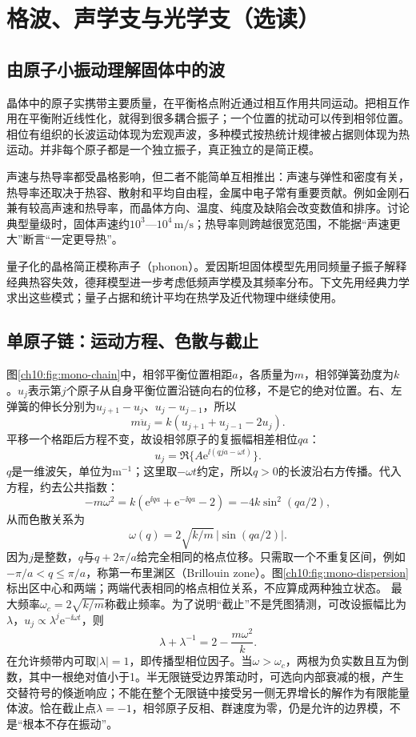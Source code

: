 \section{格波、声学支与光学支（选读）}\label{ch10:sec:lattice}
\subsection{由原子小振动理解固体中的波}
晶体中的原子实携带主要质量，在平衡格点附近通过相互作用共同运动。把相互作用在平衡附近线性化，就得到很多耦合振子；一个位置的扰动可以传到相邻位置。相位有组织的长波运动体现为宏观声波，多种模式按热统计规律被占据则体现为热运动。并非每个原子都是一个独立振子，真正独立的是简正模。

声速与热导率都受晶格影响，但二者不能简单互相推出：声速与弹性和密度有关，热导率还取决于热容、散射和平均自由程，金属中电子常有重要贡献。例如金刚石兼有较高声速和热导率，而晶体方向、温度、纯度及缺陷会改变数值和排序。讨论典型量级时，固体声速约$10^3$—$10^4\,\mathrm{m/s}$；热导率则跨越很宽范围，不能据“声速更大”断言“一定更导热”。

量子化的晶格简正模称声子（phonon）。爱因斯坦固体模型先用同频量子振子解释经典热容失效，德拜模型进一步考虑低频声学模及其频率分布。下文先用经典力学求出这些模式；量子占据和统计平均在热学及近代物理中继续使用。

\subsection{单原子链：运动方程、色散与截止}
图\ref{ch10:fig:mono-chain}中，相邻平衡位置相距$a$，各质量为$m$，相邻弹簧劲度为$k$。$u_j$表示第$j$个原子从自身平衡位置沿链向右的位移，不是它的绝对位置。右、左弹簧的伸长分别为$u_{j+1}-u_j$、$u_j-u_{j-1}$，所以
\begin{equation}\label{ch10:eq:mono-motion}
 m\ddot u_j=k(u_{j+1}+u_{j-1}-2u_j).
\end{equation}
\chTenMonoChainFigure
平移一个格距后方程不变，故设相邻原子的复振幅相差相位$qa$：
\[
 u_j=\Re\{A\mathrm e^{\ii(qja-\omega t)}\}.
\]
$q$是一维波矢，单位为$\mathrm{m^{-1}}$；这里取$-\omega t$约定，所以$q>0$的长波沿右方传播。代入方程，约去公共指数：
\[
 -m\omega^2=k(\mathrm e^{\ii qa}+\mathrm e^{-\ii qa}-2)
 =-4k\sin^2(qa/2),
\]
从而色散关系为
\begin{equation}\label{ch10:eq:mono-dispersion}
 \omega(q)=2\sqrt{k/m}\,|\sin(qa/2)|.
\end{equation}
因为$j$是整数，$q$与$q+2\pi/a$给完全相同的格点位移。只需取一个不重复区间，例如$-\pi/a<q\leq\pi/a$，称第一布里渊区（Brillouin zone）。图\ref{ch10:fig:mono-dispersion}标出区中心和两端；两端代表相同的格点相位关系，不应算成两种独立状态。
\chTenMonoDispersionFigure
最大频率$\omega_c=2\sqrt{k/m}$称截止频率。为了说明“截止”不是凭图猜测，可改设振幅比为$\lambda$，$u_j\propto\lambda^j\mathrm e^{-\ii\omega t}$，则
\[
 \lambda+\lambda^{-1}=2-\frac{m\omega^2}{k}.
\]
在允许频带内可取$|\lambda|=1$，即传播型相位因子。当$\omega>\omega_c$，两根为负实数且互为倒数，其中一根绝对值小于1。半无限链受边界策动时，可选向内部衰减的根，产生交替符号的倏逝响应；不能在整个无限链中接受另一侧无界增长的解作为有限能量体波。恰在截止点$\lambda=-1$，相邻原子反相、群速度为零，仍是允许的边界模，不是“根本不存在振动”。

